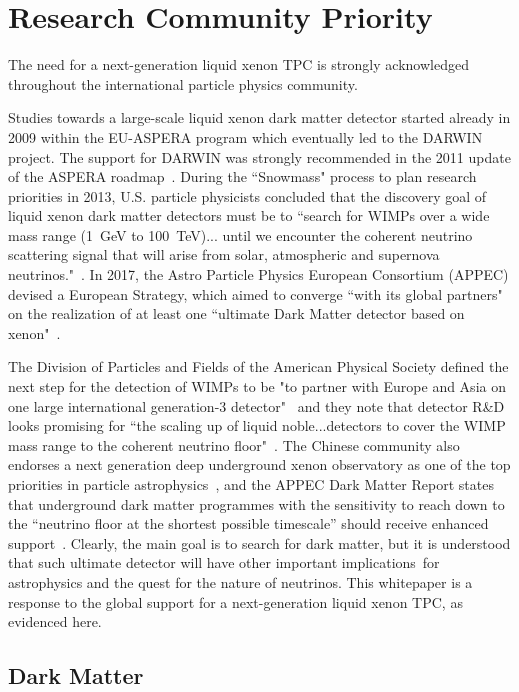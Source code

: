 \section{Research Community Priority}\label{sec:priority}

The need for a next-generation liquid xenon TPC is strongly acknowledged throughout the international particle physics community. 

Studies towards a large-scale liquid xenon dark matter detector started already in 2009 within the EU-ASPERA program which eventually led to the DARWIN project. The support for DARWIN was strongly recommended in the 2011 update of the ASPERA roadmap~\cite{ASPERA2011}. During the ``Snowmass" process to plan research priorities in 2013, U.S. particle physicists concluded that the discovery goal of liquid xenon dark matter detectors must be to ``search for WIMPs over a wide mass range (1~GeV to 100~TeV)... until we encounter the coherent neutrino scattering signal that will arise from solar, atmospheric and supernova neutrinos."~\cite{Snowmass:2013}. In 2017, the Astro Particle Physics European Consortium (APPEC) devised a European Strategy, which aimed to converge ``with its global partners" on the realization of at least one ``ultimate Dark Matter detector based on xenon"~\cite{APPEC:2017}. 

The Division of Particles and Fields of the American Physical Society defined the next step for the detection of WIMPs to be "to partner with Europe and Asia on one large international generation-3 detector"~\cite{DPF:2018a} and they note that detector R\&D looks promising for ``the scaling up of liquid noble...detectors to cover the WIMP mass range to the coherent neutrino floor"~\cite{DPF:2018b}. The Chinese community also endorses a next generation deep underground xenon observatory as one of the top priorities in particle astrophysics~\cite{China:2021}, and the APPEC Dark Matter Report states that underground dark matter programmes with the sensitivity to reach down to the ``neutrino floor at the shortest possible timescale'' should receive enhanced support~\cite{Billard:2021uyg}. Clearly, the main goal is to search for dark matter, but it is understood that such ultimate detector will have other important implications for astrophysics and the quest for the nature of neutrinos. This whitepaper is a response to the global support for a next-generation liquid xenon TPC, as evidenced here.

\subsection{Dark Matter}

